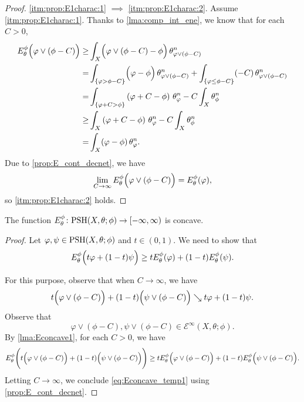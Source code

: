 \begin{proof}
    \ref{itm:prop:E1charac:1} $\implies$ \ref{itm:prop:E1charac:2}. Assume \ref{itm:prop:E1charac:1}. Thanks to \cref{lma:comp_int_ene}, we know that for each $C>0$,
    \[
    \begin{aligned}
    E_{\theta}^{\phi}\Bigl(\varphi\lor (\phi-C)\Bigr)\geq & \int_X \Bigl(\varphi\lor (\phi-C)-\phi \Bigr)\,\theta_{\varphi\lor (\phi-C)}^n\\
    =& \int_{\left\{ \varphi>\phi-C \right\}} \Bigl(\varphi-\phi \Bigr)\,\theta_{\varphi \lor (\phi-C)}^n+ \int_{\left\{ \varphi\leq \phi-C \right\}} (-C)\,\theta_{\varphi\lor (\phi-C)}^n \\
    =& \int_{\{\varphi+C>\phi\}} \left(\varphi+C-\phi \right)\,\theta_{\varphi}^n-C\int_X \theta_{\phi}^n\\
    \geq & \int_X \left(\varphi+C-\phi \right)\,\theta_{\varphi}^n-C\int_X \theta_{\phi}^n\\
    =& \int_X (\varphi-\phi)\,\theta_{\varphi}^n.
    \end{aligned}
    \]
    Due to \cref{prop:E_cont_decnet}, we have
    \[
    \lim_{C\to\infty}E_{\theta}^{\phi}\Bigl(\varphi\lor (\phi-C)\Bigr)=E_{\theta}^{\phi}(\varphi),
    \]
    so \ref{itm:prop:E1charac:2} holds.
\end{proof}

\begin{corollary}\label{cor:E_concave2}
    The function $E^{\phi}_{\theta}\colon \mathrm{PSH}(X,\theta;\phi)\rightarrow [-\infty,\infty)$ is concave.
\end{corollary}
\begin{proof}
    Let $\varphi,\psi\in \mathrm{PSH}(X,\theta;\phi)$ and $t\in (0,1)$. We need to show that
    \begin{equation}\label{eq:Econcave_temp1}
    E^{\phi}_{\theta}\Bigl( t\varphi+(1-t)\psi \Bigr)\geq tE^{\phi}_{\theta}(\varphi)+(1-t)E^{\phi}_{\theta}(\psi).
    \end{equation}

    For this purpose, observe that when $C\to \infty$, we have
    \[
        t\Bigl(\varphi\lor (\phi-C)\Bigr)+(1-t)\Bigl(\psi\lor (\phi-C)\Bigr)\searrow t\varphi+(1-t)\psi.
    \]
    Observe that
    \[
        \varphi\lor (\phi-C),\psi\lor (\phi-C)\in \mathcal{E}^{\infty}(X,\theta;\phi).
    \]
    By \cref{lma:Econcave1}, for each $C>0$, we have
    \[
        E_{\theta}^{\phi}\Biggl( t\Bigl(\varphi\lor (\phi-C)\Bigr)+(1-t)\Bigl(\psi\lor (\phi-C)\Bigr) \Biggr)\geq tE_{\theta}^{\phi}\Bigl(\varphi\lor (\phi-C)\Bigr)+(1-t)E_{\theta}^{\phi}\Bigl(\psi\lor (\phi-C)\Bigr).
    \]
    Letting $C\to \infty$, we conclude \eqref{eq:Econcave_temp1} using \cref{prop:E_cont_decnet}.
\end{proof}

